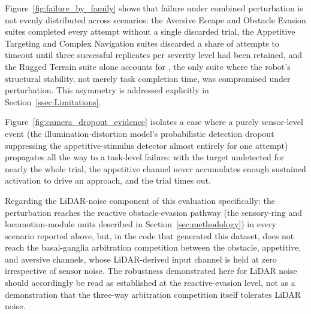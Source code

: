 Figure~\ref{fig:failure_by_family} shows that failure under combined perturbation is not evenly distributed across scenarios: the Aversive Escape and Obstacle Evasion suites completed every attempt without a single discarded trial, the Appetitive Targeting and Complex Navigation suites discarded a share of attempts to timeout until three successful replicates per severity level had been retained, and the Rugged Terrain suite alone accounts for , the only suite where the robot's structural stability, not merely task completion time, was compromised under perturbation. This asymmetry is addressed explicitly in Section~\ref{ssec:Limitations}.


Figure~\ref{fig:camera_dropout_evidence} isolates a case where a purely sensor-level event (the illumination-distortion model's probabilistic detection dropout suppressing the appetitive-stimulus detector almost entirely for one attempt) propagates all the way to a task-level failure: with the target undetected for nearly the whole trial, the appetitive channel never accumulates enough sustained activation to drive an approach, and the trial times out. 

Regarding the LiDAR-noise component of this evaluation specifically: the perturbation reaches the reactive obstacle-evasion pathway (the sensory-ring and locomotion-module units described in Section~\ref{sec:methodology}) in every scenario reported above, but, in the code that generated this dataset, does not reach the basal-ganglia arbitration competition between the obstacle, appetitive, and aversive channels, whose LiDAR-derived input channel is held at zero irrespective of sensor noise. The robustness demonstrated here for LiDAR noise should accordingly be read as established at the reactive-evasion level, not as a demonstration that the three-way arbitration competition itself tolerates LiDAR noise.

